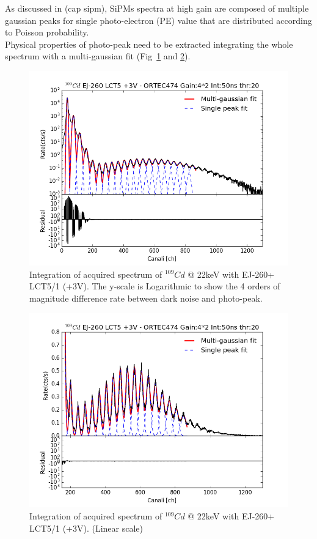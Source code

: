 \documentclass[10pt,a4paper, openany]{book}
\begin{document}
As discussed in (cap sipm), SiPMs spectra at high gain are composed of multiple gaussian peaks for single photo-electron (PE) value that are distributed according to Poisson probability.\\

Physical properties of photo-peak need to be extracted integrating the whole spectrum with a multi-gaussian fit (Fig~\ref{fig:spec_int} and \ref{fig:spec_int_pk}).

\begin{figure}[!h]
\begin{center}
\includegraphics[scale=0.5]{imm/spec_int.png}
\end{center}
\caption{Integration of acquired spectrum of $^{109}Cd$ @ 22keV with EJ-260+ LCT5/1 (+3V). The y-scale is Logarithmic to show the 4 orders of magnitude difference rate between dark noise and photo-peak. } 
\label{fig:spec_int}
\end{figure}

\begin{figure}[!h]
\begin{center}
\includegraphics[scale=0.5]{imm/spec_int_pk.png}
\end{center}
\caption{Integration of acquired spectrum of $^{109}Cd$ @ 22keV with EJ-260+ LCT5/1 (+3V). (Linear scale) } 
\label{fig:spec_int_pk}
\end{figure}
\end{document}
